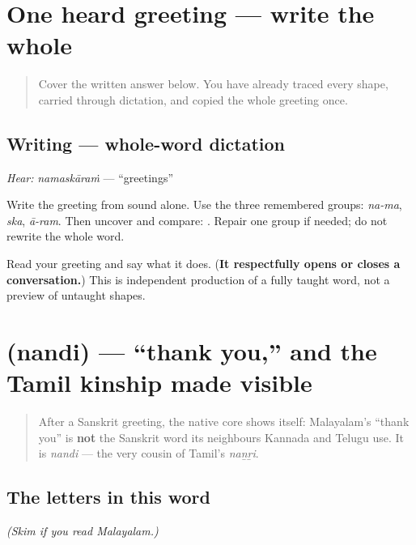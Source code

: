 \section[\texorpdfstring{\ml{നമസ്കാരം} (namaskāraṁ)}{നമസ്കാരം (namaskāraṁ)}]{One heard greeting — write the whole}

\label{lesson:ML-W01-namaskaram-dictation}



\begin{quote}
Cover the written answer below. You have already traced every shape, carried \textbf{} through dictation, and copied the whole greeting once.
\end{quote}

\subsection*{Writing — whole-word dictation}
\emph{Hear:} \emph{namaskāraṁ} — “greetings”

Write the greeting from sound alone. Use the three remembered groups: \emph{na-ma}, \emph{ska}, \emph{ā-ram}. Then uncover and compare: \textbf{}. Repair one group if needed; do not rewrite the whole word.

\begin{tcolorbox}[breakable,colback=teal!4,colframe=teal!35!black,title={Before you move on}]
Read your greeting and say what it does. (\textbf{It respectfully opens or closes a conversation.}) This is independent production of a fully taught word, not a preview of untaught shapes.
\end{tcolorbox}
\section[\texorpdfstring{\ml{നന്ദി} (nandi)}{നന്ദി (nandi)}]{ (nandi) — \textquotedblleft{}thank you,\textquotedblright{} and the Tamil kinship made visible}

\label{lesson:ML-C01-nandi}



\begin{quote}
After a Sanskrit greeting, the native core shows itself: Malayalam's \textquotedblleft{}thank you\textquotedblright{} is \textbf{not} the Sanskrit word its neighbours Kannada and Telugu use. It is \emph{nandi} — the very cousin of Tamil's \emph{naṉṟi}.
\end{quote}

\subsection*{The letters in this word}
\emph{(Skim if you read Malayalam.)}

